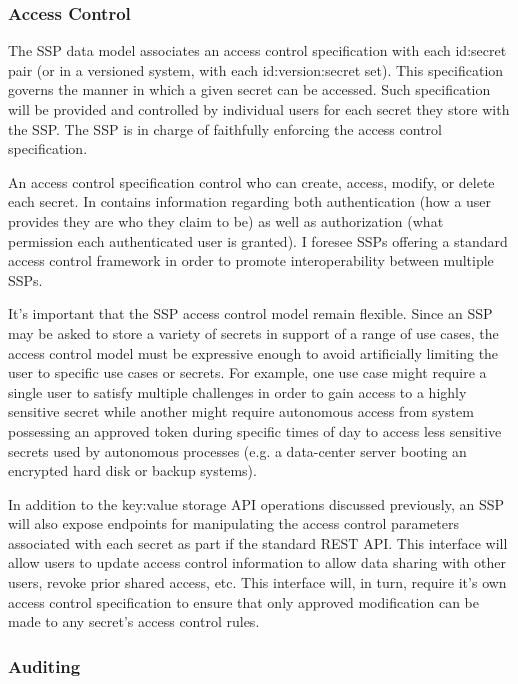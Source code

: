 \subsubsection{Access Control}

The SSP data model associates an access control specification with
each id:secret pair (or in a versioned system, with each
id:version:secret set). This specification governs the manner in which
a given secret can be accessed. Such specification will be provided
and controlled by individual users for each secret they store with the
SSP. The SSP is in charge of faithfully enforcing the access control
specification.

An access control specification control who can create, access,
modify, or delete each secret. In contains information regarding both
authentication (how a user provides they are who they claim to be) as
well as authorization (what permission each authenticated user is
granted). I foresee SSPs offering a standard access control framework
in order to promote interoperability between multiple SSPs.

It's important that the SSP access control model remain
flexible. Since an SSP may be asked to store a variety of secrets in
support of a range of use cases, the access control model must be
expressive enough to avoid artificially limiting the user to specific
use cases or secrets. For example, one use case might require a single
user to satisfy multiple challenges in order to gain access to a
highly sensitive secret while another might require autonomous access
from system possessing an approved token during specific times of day
to access less sensitive secrets used by autonomous processes (e.g. a
data-center server booting an encrypted hard disk or backup systems).

In addition to the key:value storage API operations discussed
previously, an SSP will also expose endpoints for manipulating the
access control parameters associated with each secret as part if the
standard REST API. This interface will allow users to update access
control information to allow data sharing with other users, revoke
prior shared access, etc. This interface will, in turn, require it's
own access control specification to ensure that only approved
modification can be made to any secret's access control rules.

\subsubsection{Auditing}

